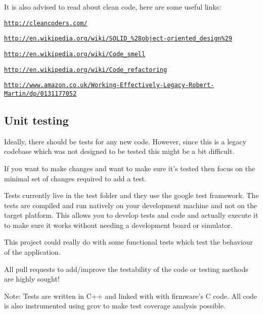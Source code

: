 It is also advised to read about clean code, here are some useful links\+:


\begin{DoxyItemize}
\item \href{http://cleancoders.com/}{\tt http\+://cleancoders.\+com/}
\item \href{http://en.wikipedia.org/wiki/SOLID_%28object-oriented_design%29}{\tt http\+://en.\+wikipedia.\+org/wiki/\+S\+O\+L\+I\+D\+\_\+\%28object-\/oriented\+\_\+design\%29}
\item \href{http://en.wikipedia.org/wiki/Code_smell}{\tt http\+://en.\+wikipedia.\+org/wiki/\+Code\+\_\+smell}
\item \href{http://en.wikipedia.org/wiki/Code_refactoring}{\tt http\+://en.\+wikipedia.\+org/wiki/\+Code\+\_\+refactoring}
\item \href{http://www.amazon.co.uk/Working-Effectively-Legacy-Robert-Martin/dp/0131177052}{\tt http\+://www.\+amazon.\+co.\+uk/\+Working-\/\+Effectively-\/\+Legacy-\/\+Robert-\/\+Martin/dp/0131177052}
\end{DoxyItemize}

\subsection*{Unit testing}

Ideally, there should be tests for any new code. However, since this is a legacy codebase which was not designed to be tested this might be a bit difficult.

If you want to make changes and want to make sure it's tested then focus on the minimal set of changes required to add a test.

Tests currently live in the {\ttfamily test} folder and they use the google test framework. The tests are compiled and run natively on your development machine and not on the target platform. This allows you to develop tests and code and actually execute it to make sure it works without needing a development board or simulator.

This project could really do with some functional tests which test the behaviour of the application.

All pull requests to add/improve the testability of the code or testing methods are highly sought!

Note\+: Tests are written in C++ and linked with with firmware's C code. All code is also instrumented using gcov to make test coverage analysis possible.

